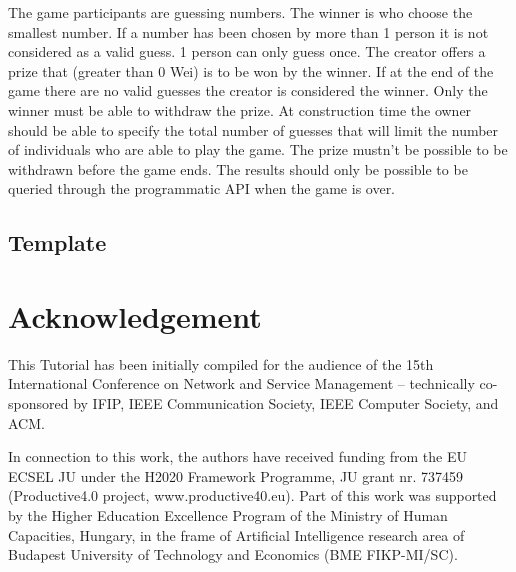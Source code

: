 \documentclass[a4paper]{article}
\begin{document}
The game participants are guessing numbers. The winner is who choose the smallest number. If a number has been chosen by more than 1 person it is not considered as a valid guess. 1 person can only guess once. The creator offers a prize that (greater than 0 Wei) is to be won by the winner. If at the end of the game there are no valid guesses the creator is considered the winner. Only the winner must be able to withdraw the prize. At construction time the owner should be able to specify the total number of guesses that will limit the number of individuals who are able to play the game. The prize mustn't be possible to be withdrawn before the game ends. The results should only be possible to be queried through the programmatic API when the game is over.

\subsection{Template}

\section*{Acknowledgement}
This Tutorial has been initially compiled for the audience of the 15th International Conference on Network and Service Management -- technically co-sponsored by IFIP, IEEE Communication Society, IEEE Computer Society, and ACM.

In connection to this work, the authors have received funding  from  the  EU  ECSEL JU under the H2020 Framework Programme, JU grant nr.  737459  (Productive4.0  project,  www.productive40.eu).
Part of this work was supported by the Higher Education Excellence  Program  of  the  Ministry  of  Human  Capacities, Hungary, in the frame of Artificial Intelligence research area of Budapest University of Technology and Economics (BME FIKP-MI/SC). 



\end{document}

